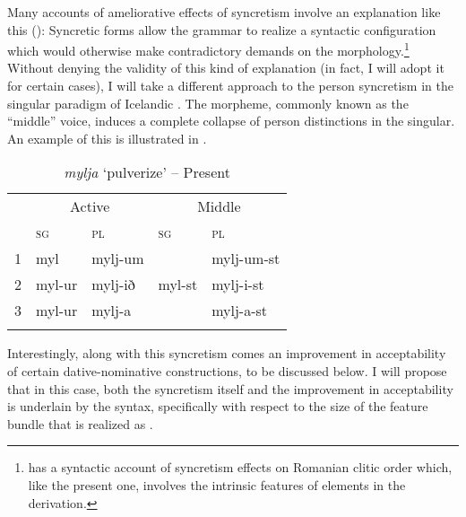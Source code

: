 \documentclass[output=paper]{langscibook}
\begin{document}
Many accounts of ameliorative effects of syncretism involve an explanation like this (\citealt{pullum1986phonological,bejar1999multiple,Kratzer:2009jq,Ussery:2009jd,Bjorkman2016}): Syncretic forms allow the grammar to realize a syntactic configuration which would otherwise make contradictory demands on the morphology.\footnote{\citet{Savescu:2009al} has a syntactic account of syncretism effects on Romanian clitic order which, like the present one,  involves the intrinsic features of elements in the derivation.}
Without denying the validity of this kind of explanation (in fact, I will adopt it for certain cases), I will take a different approach to the person syncretism in the singular paradigm of Icelandic \stvsn. The \sti morpheme, commonly known as the “middle” voice, induces a complete collapse of person distinctions in the singular. An example of this is illustrated in . 

\begin{table}
 \caption{\label{woodxes}\textit{mylja} `pulverize' -- Present}
    \begin{tabular}{*5{l}} 
    \lsptoprule
         & \multicolumn{2}{c}{Active} & \multicolumn{2}{c}{Middle} \\\cmidrule(lr){2-3}\cmidrule(lr){4-5}
          & \textsc{sg} & \textsc{pl}  & \textsc{sg} & \textsc{pl} \\\midrule
        1 & myl & mylj-um    &         &  mylj-um-st \\
        2 & myl-ur & mylj-ið & myl-st &  mylj-i-st  \\
        3 & myl-ur  & mylj-a &        & mylj-a-st  \\
    \lspbottomrule
    \end{tabular}
\end{table}

Interestingly, along with this syncretism comes an improvement in acceptability of certain dative-nominative constructions, to be discussed below. I will propose that in this case, both the syncretism itself and the improvement in acceptability is underlain by the syntax, specifically with respect to the size of the feature bundle that is realized as \stin. %
\end{document}
